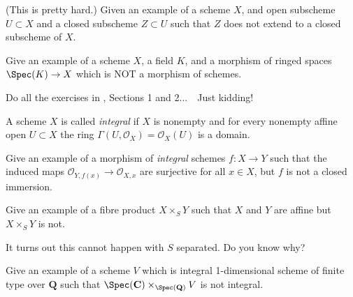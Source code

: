 \begin{exercise}
\label{exercise-closed-subscheme-does-not-extend}
(This is pretty hard.)
Given an example of a scheme $X$, and open subscheme $U \subset X$
and a closed subscheme $Z \subset U$ such that $Z$ does not extend
to a closed subscheme of $X$.
\end{exercise}

\begin{exercise}
\label{exercise-not-morphism-schemes}
Give an example of a scheme $X$, a field $K$, and a
morphism of ringed spaces $\Spec(K) \to X$ which
is NOT a morphism of schemes.
\end{exercise}

\begin{exercise}
\label{exercise-just-kidding}
Do all the exercises in \cite[Chapter II]{H},
Sections 1 and 2...\ \ Just kidding!
\end{exercise}

\begin{definition}
\label{definition-integral}
A scheme $X$ is called {\it integral} if $X$ is nonempty and
for every nonempty affine open $U \subset X$ the ring
$\Gamma(U, \mathcal{O}_X) = \mathcal{O}_X(U)$ is a domain.
\end{definition}

\begin{exercise}
\label{exercise-morphism-integral-schemes-surjective-stalks-not-closed}
Give an example of a morphism of {\it integral}
schemes $f : X \to Y$ such that the induced maps ${\mathcal O}_{Y, f(x)}
\to {\mathcal O}_{X, x}$ are surjective for all $x\in X$, but $f$
is not a closed immersion.
\end{exercise}

\begin{exercise}
\label{exercise-fibre-product-affines-not-affine}
Give an example of a fibre product $X \times_S Y$ such that $X$ and $Y$
are affine but $X \times_S Y$ is not.
\end{exercise}

\begin{remark}
\label{remark-separated-base-fibre-product-affines-affine}
It turns out this cannot happen with $S$ separated. Do you know why?
\end{remark}

\begin{exercise}
\label{exercise-not-geometrically-integral}
Give an example of a scheme
$V$ which is integral 1-dimensional scheme of finite type
over ${\mathbf Q}$ such that
$\Spec({\mathbf C}) \times_{\Spec({\mathbf Q})} V$
is not integral.
\end{exercise}

